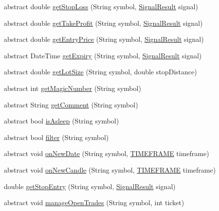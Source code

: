 \begin{DoxyCompactItemize}
\item 
abstract double \hyperlink{class_m_q_l4_c_sharp_1_1_base_1_1_base_strategy_a07afe70451e9c621559d93fa4602f33c}{get\+Stop\+Loss} (String symbol, \hyperlink{class_m_q_l4_c_sharp_1_1_base_1_1_common_1_1_signal_result}{Signal\+Result} signal)
\item 
abstract double \hyperlink{class_m_q_l4_c_sharp_1_1_base_1_1_base_strategy_a8cb8687f300bd870d131d53900f3ea24}{get\+Take\+Profit} (String symbol, \hyperlink{class_m_q_l4_c_sharp_1_1_base_1_1_common_1_1_signal_result}{Signal\+Result} signal)
\item 
abstract double \hyperlink{class_m_q_l4_c_sharp_1_1_base_1_1_base_strategy_a41c8b3a093997e0af2a7a1a764dd475a}{get\+Entry\+Price} (String symbol, \hyperlink{class_m_q_l4_c_sharp_1_1_base_1_1_common_1_1_signal_result}{Signal\+Result} signal)
\item 
abstract Date\+Time \hyperlink{class_m_q_l4_c_sharp_1_1_base_1_1_base_strategy_ae4f77b309c6242fc7f2efcb424a17b80}{get\+Expiry} (String symbol, \hyperlink{class_m_q_l4_c_sharp_1_1_base_1_1_common_1_1_signal_result}{Signal\+Result} signal)
\item 
abstract double \hyperlink{class_m_q_l4_c_sharp_1_1_base_1_1_base_strategy_aa64dd53a278828184cea8f2e000f53fa}{get\+Lot\+Size} (String symbol, double stop\+Distance)
\item 
abstract int \hyperlink{class_m_q_l4_c_sharp_1_1_base_1_1_base_strategy_a532a3b226a1b893aada36ec57841cd06}{get\+Magic\+Number} (String symbol)
\item 
abstract String \hyperlink{class_m_q_l4_c_sharp_1_1_base_1_1_base_strategy_a6e49d63f7b64ea9261226a703fa76603}{get\+Comment} (String symbol)
\item 
abstract bool \hyperlink{class_m_q_l4_c_sharp_1_1_base_1_1_base_strategy_a5dcc52590eea6c66f4b0f415b8eafd78}{is\+Asleep} (String symbol)
\item 
abstract bool \hyperlink{class_m_q_l4_c_sharp_1_1_base_1_1_base_strategy_aa0d9417bcd5c803b3c0f7eedab424547}{filter} (String symbol)
\item 
abstract void \hyperlink{class_m_q_l4_c_sharp_1_1_base_1_1_base_strategy_a3aae13e14ff761dad339a190357258db}{on\+New\+Date} (String symbol, \hyperlink{namespace_m_q_l4_c_sharp_1_1_base_1_1_enums_a838810aaa87c63c12737408dba8c0b35}{T\+I\+M\+E\+F\+R\+A\+ME} timeframe)
\item 
abstract void \hyperlink{class_m_q_l4_c_sharp_1_1_base_1_1_base_strategy_ac8137eeb3d34a9132296e8dd3db829bc}{on\+New\+Candle} (String symbol, \hyperlink{namespace_m_q_l4_c_sharp_1_1_base_1_1_enums_a838810aaa87c63c12737408dba8c0b35}{T\+I\+M\+E\+F\+R\+A\+ME} timeframe)
\item 
double \hyperlink{class_m_q_l4_c_sharp_1_1_base_1_1_base_strategy_aa6ed93ca58ea40343adebb27c5ccc86a}{get\+Stop\+Entry} (String symbol, \hyperlink{class_m_q_l4_c_sharp_1_1_base_1_1_common_1_1_signal_result}{Signal\+Result} signal)
\item 
abstract void \hyperlink{class_m_q_l4_c_sharp_1_1_base_1_1_base_strategy_af5a387f1705cdbabf5b161870b8f05a8}{manage\+Open\+Trades} (String symbol, int ticket)
\end{DoxyCompactItemize}

